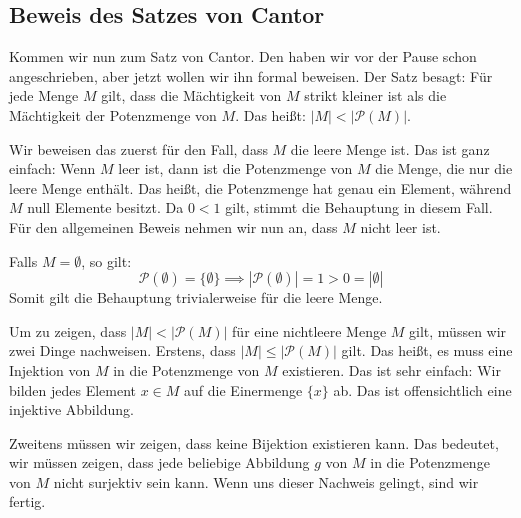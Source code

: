 \subsection{Beweis des Satzes von Cantor}

\begin{spoken-clean}[00:59:25 - 01:00:55]
Kommen wir nun zum Satz von Cantor. Den haben wir vor der Pause schon angeschrieben, aber jetzt wollen wir ihn formal beweisen. Der Satz besagt: Für jede Menge $M$ gilt, dass die Mächtigkeit von $M$ strikt kleiner ist als die Mächtigkeit der Potenzmenge von $M$. Das heißt: $|M| < |\mathcal{P}(M)|$.

Wir beweisen das zuerst für den Fall, dass $M$ die leere Menge ist. Das ist ganz einfach: Wenn $M$ leer ist, dann ist die Potenzmenge von $M$ die Menge, die nur die leere Menge enthält. Das heißt, die Potenzmenge hat genau ein Element, während $M$ null Elemente besitzt. Da $0 < 1$ gilt, stimmt die Behauptung in diesem Fall. Für den allgemeinen Beweis nehmen wir nun an, dass $M$ nicht leer ist.
\end{spoken-clean}

\begin{math-stroke}

\begin{short-proof}[Beweis für $M = \emptyset$]
Falls $M = \emptyset$, so gilt:
\[
\mathcal{P}(\emptyset) = \{\emptyset\} \implies |\mathcal{P}(\emptyset)| = 1 > 0 = |\emptyset|
\]
Somit gilt die Behauptung trivialerweise für die leere Menge.
\end{short-proof}
\end{math-stroke}

\begin{spoken-clean}[01:00:55 - 01:02:29]
Um zu zeigen, dass $|M| < |\mathcal{P}(M)|$ für eine nichtleere Menge $M$ gilt, müssen wir zwei Dinge nachweisen. Erstens, dass $|M| \le |\mathcal{P}(M)|$ gilt. Das heißt, es muss eine Injektion von $M$ in die Potenzmenge von $M$ existieren. Das ist sehr einfach: Wir bilden jedes Element $x \in M$ auf die Einermenge $\{x\}$ ab. Das ist offensichtlich eine injektive Abbildung.

Zweitens müssen wir zeigen, dass keine Bijektion existieren kann. Das bedeutet, wir müssen zeigen, dass jede beliebige Abbildung $g$ von $M$ in die Potenzmenge von $M$ nicht surjektiv sein kann. Wenn uns dieser Nachweis gelingt, sind wir fertig.
\end{spoken-clean}

